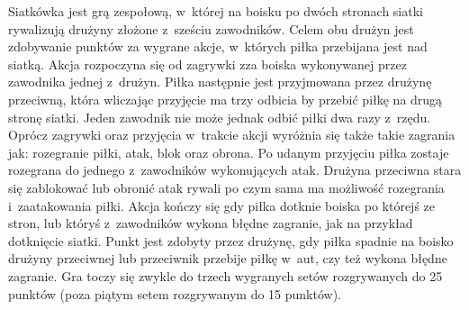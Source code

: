 \documentclass[a4paper,twoside,12pt]{book}
\begin{document}
Siatkówka jest grą zespołową, w~której na boisku po dwóch stronach siatki rywalizują drużyny złożone z~sześciu zawodników. Celem obu drużyn jest zdobywanie punktów za wygrane akcje, w~których piłka przebijana jest nad siatką. Akcja rozpoczyna się od zagrywki zza boiska wykonywanej przez zawodnika jednej z~drużyn. Piłka następnie jest przyjmowana przez drużynę przeciwną, która wliczając przyjęcie ma trzy odbicia by przebić piłkę na drugą stronę siatki. Jeden zawodnik nie może jednak odbić piłki dwa razy z~rzędu. Oprócz zagrywki oraz przyjęcia w~trakcie akcji wyróżnia się także takie zagrania jak: rozegranie piłki, atak, blok oraz obrona. Po udanym przyjęciu piłka zostaje rozegrana do jednego z~zawodników wykonujących atak. Drużyna przeciwna stara się zablokować lub obronić atak rywali po czym sama ma możliwość rozegrania i~zaatakowania piłki. Akcja kończy się gdy piłka dotknie boiska po którejś ze stron, lub któryś z~zawodników wykona błędne zagranie, jak na przykład dotknięcie siatki. Punkt jest zdobyty przez drużynę, gdy piłka spadnie na boisko drużyny przeciwnej lub przeciwnik przebije piłkę w~aut, czy też wykona błędne zagranie. Gra toczy się zwykle do trzech wygranych setów rozgrywanych do 25 punktów (poza piątym setem rozgrywanym do 15 punktów). 
\end{document}
